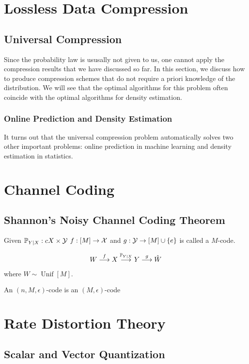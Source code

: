 \chapter{Lossless Data Compression}

\section{Universal Compression}

Since the probability law is ususally not given to us, one cannot apply the compression results that we have discussed so far.
In this section, we discuss how to produce compression schemes that do not require a priori knowledge of the distribution.
We will see that the optimal algorithms for this problem often coincide with the optimal algorithms for density estimation.

\subsection{Online Prediction and Density Estimation}

It turns out that the universal compression problem
automatically solves two other important problems: online prediction in machine learning and density estimation in statistics.


\chapter{Channel Coding}

\section{Shannon's Noisy Channel Coding Theorem}

Given $\mathbb{P}_{Y|X}:cX\times\mathcal{Y}$
$f:[M]\to\mathcal{X}$ and $g:\mathcal{Y}\to [M]\cup\{e\}$ is called a $M$-code.

\[W\stackrel{f}{\longrightarrow}X \stackrel{\mathbb{P}_{Y|X}}{\longrightarrow} Y \stackrel{g}{\longrightarrow} \hat{W}\] 
where $W\sim\operatorname{Unif}[M]$.

An $(n,M,\epsilon)$-code is an $(M,\epsilon)$-code

\chapter{Rate Distortion Theory}



\section{Scalar and Vector Quantization}

